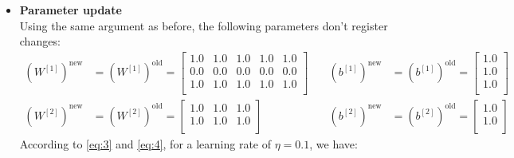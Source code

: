 \documentclass{exam}
\begin{document}
\begin{questions}
\begin{itemize}
                \item \textbf{Parameter update} \\[0.4em]
                Using the same argument as before, the following parameters don't register changes:
                \begin{equation*}
                    \begin{split}
                        (W^{[1]})^{\text{new}} &= (W^{[1]})^{\text{old}} = 
                        \begin{bmatrix}
                            1.0 & 1.0 & 1.0 & 1.0 & 1.0  \\
                            0.0 & 0.0 & 0.0 & 0.0 & 0.0  \\
                            1.0 & 1.0 & 1.0 & 1.0 & 1.0  \\
                        \end{bmatrix} \\
                        (W^{[2]})^{\text{new}} &= (W^{[2]})^{\text{old}} = 
                        \begin{bmatrix}
                            1.0 & 1.0 & 1.0  \\
                            1.0 & 1.0 & 1.0  \\
                        \end{bmatrix} 
                    \end{split} \quad
                    \begin{split}
                        (b^{[1]})^{\text{new}} &= (b^{[1]})^{\text{old}} = 
                        \begin{bmatrix}
                            1.0  \\
                            1.0  \\
                            1.0  \\
                        \end{bmatrix} \\
                        (b^{[2]})^{\text{new}} &= (b^{[2]})^{\text{old}} = 
                        \begin{bmatrix}
                            1.0  \\
                            1.0  \\
                        \end{bmatrix}
                    \end{split}
                \end{equation*}
                According to \eqref{eq:3} and \eqref{eq:4}, for a learning rate of $\eta = 0.1$, we have:

\end{itemize}
\end{questions}
\end{document}
